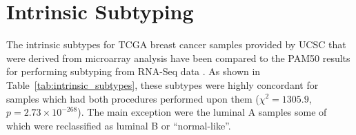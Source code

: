 \FloatBarrier


\clearpage
\chapter{Intrinsic Subtyping} \label{appendix:intrinsic_subtypes}
The intrinsic subtypes for \gls{TCGA} breast cancer samples provided by \gls{UCSC} \citep{TCGA2012} that were derived from microarray analysis have been compared to the \gls{PAM50} results for performing subtyping from \gls{RNA-Seq} data \citep{Parker2009}. As shown in Table~\ref{tab:intrinsic_subtypes}, these subtypes were highly concordant for samples which had both procedures performed upon them ($\chi^2 = 1305.9$, $p = 2.73 \times 10^{-268}$). The main exception were the luminal A samples some of which were reclassified as luminal B or ``normal-like''.

